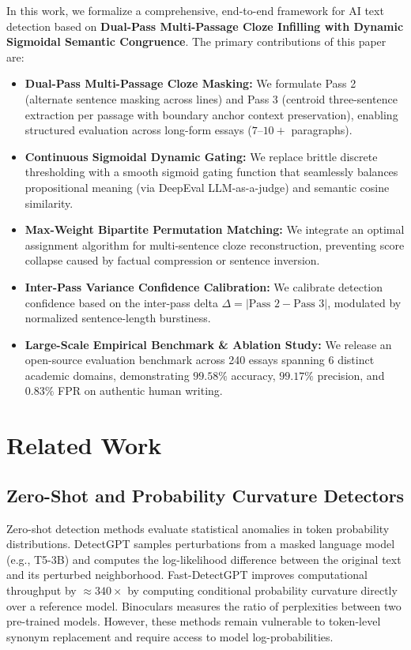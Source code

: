 \documentclass[conference]{IEEEtran}
\begin{document}
In this work, we formalize a comprehensive, end-to-end framework for AI text detection based on \textbf{Dual-Pass Multi-Passage Cloze Infilling with Dynamic Sigmoidal Semantic Congruence}. The primary contributions of this paper are:
\begin{itemize}
    \item \textbf{Dual-Pass Multi-Passage Cloze Masking:} We formulate Pass 2 (alternate sentence masking across lines) and Pass 3 (centroid three-sentence extraction per passage with boundary anchor context preservation), enabling structured evaluation across long-form essays ($7\text{--}10+$ paragraphs).
    \item \textbf{Continuous Sigmoidal Dynamic Gating:} We replace brittle discrete thresholding with a smooth sigmoid gating function that seamlessly balances propositional meaning (via DeepEval LLM-as-a-judge) and semantic cosine similarity.
    \item \textbf{Max-Weight Bipartite Permutation Matching:} We integrate an optimal assignment algorithm for multi-sentence cloze reconstruction, preventing score collapse caused by factual compression or sentence inversion.
    \item \textbf{Inter-Pass Variance Confidence Calibration:} We calibrate detection confidence based on the inter-pass delta $\Delta = |\text{Pass 2} - \text{Pass 3}|$, modulated by normalized sentence-length burstiness.
    \item \textbf{Large-Scale Empirical Benchmark & Ablation Study:} We release an open-source evaluation benchmark across 240 essays spanning 6 distinct academic domains, demonstrating $99.58\%$ accuracy, $99.17\%$ precision, and $0.83\%$ FPR on authentic human writing.
\end{itemize}

\section{Related Work}
\subsection{Zero-Shot and Probability Curvature Detectors}
Zero-shot detection methods evaluate statistical anomalies in token probability distributions. DetectGPT \cite{mitchell2023detectgpt} samples perturbations from a masked language model (e.g., T5-3B) and computes the log-likelihood difference between the original text and its perturbed neighborhood. Fast-DetectGPT \cite{bao2024fastdetectgpt} improves computational throughput by $\approx 340\times$ by computing conditional probability curvature directly over a reference model. Binoculars \cite{hans2024binoculars} measures the ratio of perplexities between two pre-trained models. However, these methods remain vulnerable to token-level synonym replacement and require access to model log-probabilities.
\end{document}
